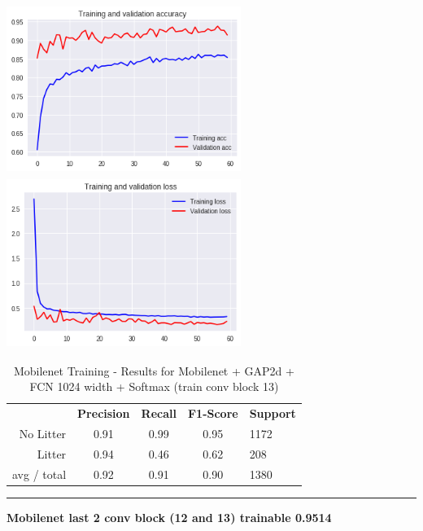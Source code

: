 \documentclass{IEEEtran}
\begin{document}
\includegraphics[width=3in,height=2.18in]{mobile/mobilenet-img013.png}
\includegraphics[width=3in,height=2.18in]{mobile/mobilenet-img014.png}


\begin{table}[ht]
\centering
\caption{Mobilenet Training - Results for Mobilenet + GAP2d + FCN 1024 width + Softmax (train conv block 13)}
\label{mobilenet1}
\begin{tabular}{rcccl}
\textbf{}   & \textbf{Precision} & \textbf{Recall} & \textbf{F1-Score} & \textbf{Support} \\
No Litter   & 0.91 &0.99 & 0.95 & 1172 \\
Litter      & 0.94 &0.46 & 0.62 & 208 \\
avg / total & 0.92 &0.91 & 0.90 & 1380 \\
\end{tabular}
\begin{center}\noindent\rule{10cm}{0.4pt}\end{center}
\end{table}

\bigskip

\textbf{Mobilenet last 2 conv block (12 and 13) trainable 0.9514}
\end{document}
